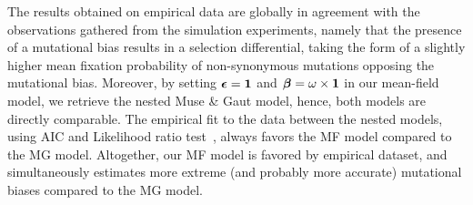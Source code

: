 \documentclass{article}
\begin{document}
The results obtained on empirical data are globally in agreement with the observations gathered from the simulation experiments, namely that the presence of a mutational bias results in a selection differential, taking the form of a slightly higher mean fixation probability of {non-synonymous} mutations opposing the mutational bias.
Moreover, by setting $\bm{\epsilon} = \bm{1}$ and $\bm{\beta} = \omega \times \bm{1}$ in our mean-field model, we retrieve the nested Muse \& Gaut model, hence, both models are directly comparable.
The empirical fit to the data between the nested models, using AIC and Likelihood ratio test~\citep{Posada2004}, always favors the MF model compared to the MG model.
Altogether, our {MF} model is favored by empirical dataset, and simultaneously estimates more extreme (and probably more accurate) mutational biases compared to the {MG} model.
\end{document}
